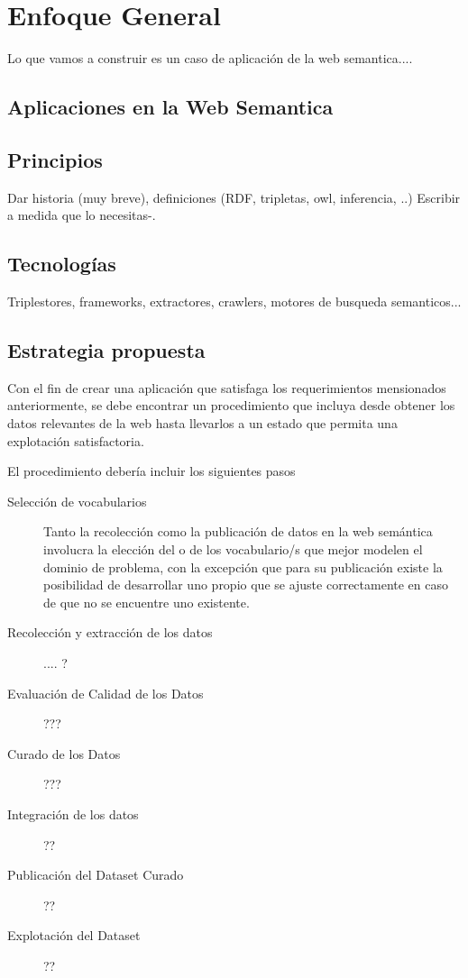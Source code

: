 \chapter{Enfoque General}
\label{chapter:estrategia}

Lo que vamos a construir es un caso de aplicación de la web semantica....

\section{Aplicaciones en la Web Semantica}
\section{Principios}
Dar historia (muy breve), definiciones  (RDF, tripletas, owl, inferencia, ..)
Escribir a medida que lo necesitas-.

\section{Tecnologías}
Triplestores, frameworks, extractores, crawlers, motores de busqueda semanticos...

\section{Estrategia propuesta}
Con el fin de crear una aplicación que satisfaga los requerimientos mensionados anteriormente, se debe encontrar
un procedimiento que incluya desde obtener los datos relevantes de la web hasta llevarlos a un estado que permita una 
explotación satisfactoria. 

El procedimiento debería incluir los siguientes pasos  

\begin{description}
\item[Selección de vocabularios ] Tanto la recolección como la publicación de datos en la web semántica involucra la elección del o de los vocabulario/s que mejor modelen el dominio de problema, con la excepción que para su publicación existe la posibilidad de desarrollar uno propio que se ajuste correctamente en caso de que no se encuentre uno existente. 
\item[Recolección y extracción de los datos ] .... ?
\item[Evaluación de Calidad de los Datos] ???
\item[Curado de los Datos] ???
\item[Integración de los datos] ?? 
\item[Publicación del Dataset Curado] ?? 
\item[Explotación del Dataset] ?? 
\end{description}

